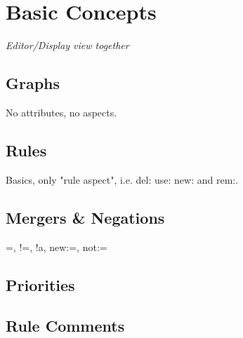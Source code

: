 \section{Basic Concepts}

\emph{Editor/Display view together}

\subsection{Graphs}

No attributes, no aspects.

\subsection{Rules}

Basics, only "rule aspect", i.e. del: use: new: and rem:.

\subsection{Mergers \& Negations}

=, !=, !a, new:=, not:=

\subsection{Priorities}

\subsection{Rule Comments}